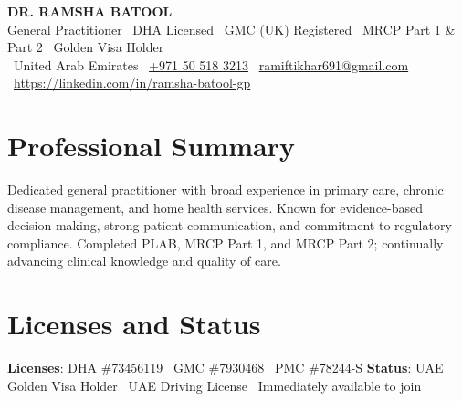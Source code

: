 \documentclass[a4paper,11pt]{article}
\begin{document}
\begin{center}
    {\Huge \textbf{DR. RAMSHA BATOOL}}\\[0.3em]
    \vspace{0.2em}
    {\large General Practitioner \textbar\ DHA Licensed \textbar\ GMC (UK) Registered \textbar\ MRCP Part 1 \& Part 2 \textbar\ Golden Visa Holder}\\[0.4em]
    \color{darkgray}
    \faMapMarker*~United Arab Emirates \quad
    \faPhone~\href{tel:+971505183213}{+971 50 518 3213} \quad
    \faEnvelope~\href{mailto:ramiftikhar691@gmail.com}{ramiftikhar691@gmail.com}\\[0.3em]
    \faLinkedin~\href{https://linkedin.com/in/ramsha-batool-gp}{https://linkedin.com/in/ramsha-batool-gp}\\[0.3em]
\end{center}


\section*{Professional Summary}
Dedicated general practitioner with broad experience in primary care, chronic disease management, and home health services. Known for evidence-based decision making, strong patient communication, and commitment to regulatory compliance. Completed PLAB, MRCP Part 1, and MRCP Part 2; continually advancing clinical knowledge and quality of care.


\section*{Licenses and Status}
\textbf{Licenses}: DHA \#73456119 \textbar\ GMC \#7930468 \textbar\ PMC \#78244-S \newline
\textbf{Status}: UAE Golden Visa Holder \textbar\ UAE Driving License \textbar\ Immediately available to join
\end{document}
